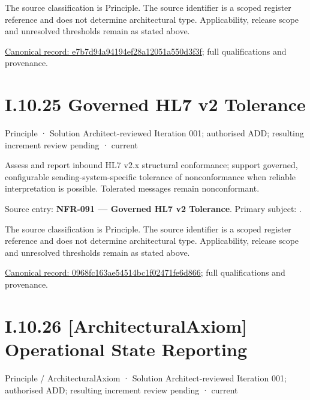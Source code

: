 The source classification is Principle. The source identifier is a scoped register reference and does not determine architectural type. Applicability, release scope and unresolved thresholds remain as stated above.


{\footnotesize \href{../../../../continuum/motivation/principle/e7b7d94a94194ef28a12051a550d3f3f.md}{Canonical record: e7b7d94a94194ef28a12051a550d3f3f}; full qualifications and provenance.}\par
\section*{I.10.25 Governed HL7 v2 Tolerance}
\label{navigation:I.10.25}

\label{element:0968fc163ae54514bc1f02471fe6d866}
{\small Principle · Solution Architect-reviewed Iteration 001; authorised ADD; resulting increment review pending · current}\par

Assess and report inbound HL7 v2.x structural conformance; support governed, configurable sending-system-specific tolerance of nonconformance when reliable interpretation is possible. Tolerated messages remain nonconformant.



Source entry: \textbf{NFR-091 — Governed HL7 v2 Tolerance}. Primary subject: \texttt{}.



The source classification is Principle. The source identifier is a scoped register reference and does not determine architectural type. Applicability, release scope and unresolved thresholds remain as stated above.


{\footnotesize \href{../../../../continuum/motivation/principle/0968fc163ae54514bc1f02471fe6d866.md}{Canonical record: 0968fc163ae54514bc1f02471fe6d866}; full qualifications and provenance.}\par
\section*{I.10.26 [ArchitecturalAxiom] Operational State Reporting}
\label{navigation:I.10.26}

\label{element:d7e3f0388d0043259585d1e4c5c948d6}
{\small Principle / ArchitecturalAxiom · Solution Architect-reviewed Iteration 001; authorised ADD; resulting increment review pending · current}\par

